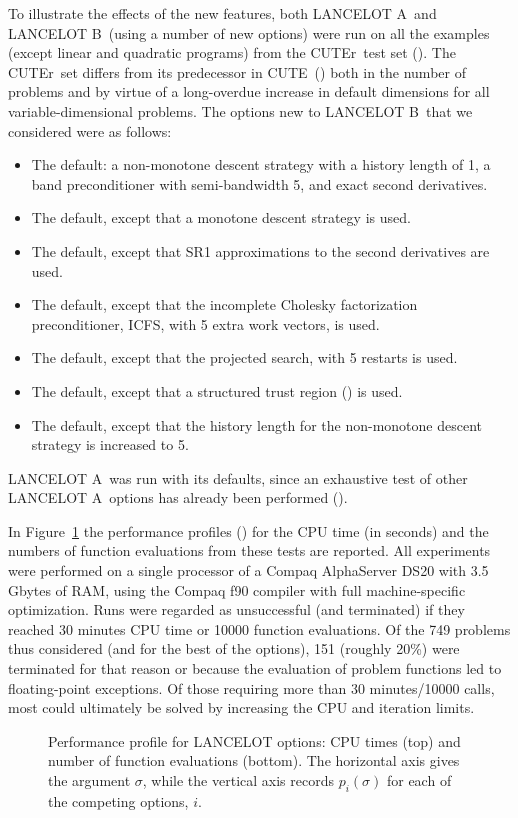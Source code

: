 \documentclass[twoside]{article}
\newcommand{\lana}{{\sf LANCELOT A}}
\newcommand{\lanb}{{\sf LANCELOT B}}
\newcommand{\cute}{{\sf CUTE}}
\newcommand{\cuter}{{\sf CUTEr}}
\begin{document}
To illustrate the effects of the new features,
both \lana\ and  \lanb\ (using a number of new options)
were run on all the examples (except linear and quadratic programs) from
the \cuter\ test set (). The \cuter\
set differs from its predecessor
in \cute\ ()
both in the number of problems and by virtue of a long-overdue
increase in default dimensions for all variable-dimensional problems.
The options new to \lanb\ that we considered were as follows:
\begin{itemize}
\item The default: a non-monotone descent strategy with a
history length of 1, a band preconditioner with semi-bandwidth 5,
and exact second derivatives.
\item The default, except that a monotone descent strategy is used.
\item The default, except that SR1 approximations to the second derivatives
are used.
\item The default, except that the  incomplete Cholesky
   factorization preconditioner, ICFS, with 5 extra work vectors, is used.
\item The default, except that the \citebb{MoreTora91} projected search,
with 5 restarts is used.
\item The default, except that a structured trust region
   () is used.
\item The default, except that the history length for the
non-monotone descent strategy is increased to 5.
\end{itemize}
\lana\ was run with its defaults, since an exhaustive test
of other \lana\ options has already been performed
().

In Figure~\ref{prof.ps}
the performance profiles () for the CPU time
(in seconds) and the numbers of function evaluations
from these tests are reported. All experiments were performed
on a single processor of a Compaq AlphaServer DS20 with 3.5 Gbytes of RAM,
using the Compaq f90 compiler with full machine-specific optimization.
Runs were regarded as unsuccessful (and terminated) if they reached
30 minutes CPU time or 10000 function evaluations.
Of the 749 problems thus considered (and for the best of the
options), 151 (roughly 20\%)
were terminated for that reason or because
the evaluation of problem functions led to floating-point exceptions. Of
those requiring more than 30 minutes/10000 calls, most could ultimately
be solved by increasing the CPU and iteration limits.
\begin{figure}[htbp]
\centerline{
}\centerline{
            }
\caption{Performance profile for LANCELOT options: CPU times (top)
and number of function evaluations (bottom). The horizontal axis
gives the argument $\sigma$, while the vertical axis records $p_i(\sigma)$
for each of the competing options, $i$.}
\label{prof.ps}
\end{figure}
\end{document}
